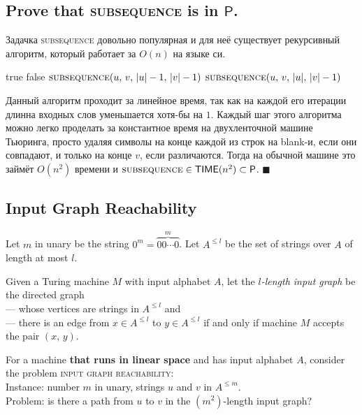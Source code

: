 \documentclass{article}
\begin{document}
  \subsection{Prove that \textsc{subsequence} is in $\mathsf{P}$.}
  Задачка \textsc{subsequence} довольно популярная и для неё существует рекурсивный алгоритм, который работает за $O(n)$ на языке си.

  \begin{algorithmic}[1]
        \State \Return true
        \State \Return false
        \State \Return $\textsc{subsequence}(u,\, v,\, |u|-1,\, |v|-1)$
      \Else
        \State \Return $\textsc{subsequence}(u,\, v,\, |u|,\, |v|-1)$
      \EndIf
    \EndFunction
  \end{algorithmic}

  Данный алгоритм проходит за линейное время, так как на каждой его итерации длинна входных слов уменьшается хотя-бы на $1$.
  Каждый шаг этого алгоритма можно легко проделать за константное время на двухленточной машине Тьюринга, просто удаляя символы на конце каждой из строк на blank-и, если они совпадают, и только на конце $v$, если различаются.
  Тогда на обычной машине это займёт $O(n^2)$ времени и $\textsc{subsequence} \in \mathsf{TIME}(n^2) \subset \mathsf{P}$.
  $\blacksquare$

  \subsection{Input Graph Reachability}
  Let $m$ in unary be the string $0^m = \overbrace{00 \cdots 0}^m$.
  Let $A^{\leq l}$ be the set of strings over $A$ of length at most $l$.

  \vspace{3mm} \noindent
  Given a Turing machine $M$ with input alphabet $A$, let the \textit{$l$-length input graph} be the directed graph \\
  --- whose vertices are strings in $A^{\leq l}$ and \\
  --- there is an edge from $x \in A^{\leq l}$ to $y \in A^{\leq l}$
  if and only if machine $M$ accepts the pair $(x,\, y)$.

  \vspace{3mm} \noindent
  For a machine \textbf{that runs in linear space} and has input alphabet $A$,
  consider the problem \textsc{input graph reachability}: \\
  \hspace*{2mm} Instance: number $m$ in unary, strings $u$ and $v$ in $A^{\leq m}$. \\
  \hspace*{2mm} Problem: is there a path from $u$ to $v$ in the $(m^2)$-length input graph?
\end{document}

